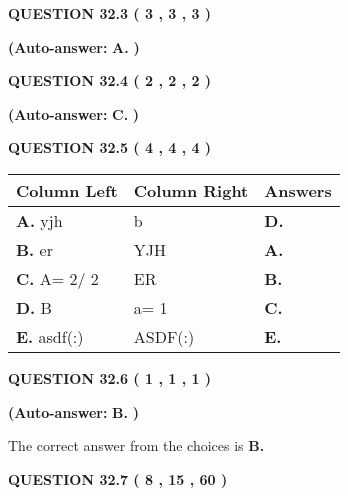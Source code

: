 \documentclass[12pt]{article}
\begin{document}
  
  
{\textbf{\large{QUESTION
32.3 
 (           3 ,           3 ,           3 )
}}}
 
 
{\textbf{(Auto-answer:}}
{\textbf{\large{
A.}}}
{\textbf{)}}
 
 
  
  
{\textbf{\large{QUESTION
32.4 
 (           2 ,           2 ,           2 )
}}}
 
 
{\textbf{(Auto-answer:}}
{\textbf{\large{
C.}}}
{\textbf{)}}
 
 
  
  
{\textbf{\large{QUESTION
32.5 
 (           4 ,           4 ,           4 )
}}}
 
 
\noindent{}
  
  
\begin{tabular}{|l|l|l|}
 \hline
 Column Left & Column Right  & Answers       \\ 
 \hline
{\textbf{\large{
A.}}}
yjh
  & 
b
 & 
{\textbf{\large{
D.}}}
 \\ 
 \hline
{\textbf{\large{
B.}}}
er
  & 
YJH
 & 
{\textbf{\large{
A.}}}
 \\ 
 \hline
{\textbf{\large{
C.}}}
 A= %
2/ %
2

  & 
ER
 & 
{\textbf{\large{
B.}}}
 \\ 
 \hline
{\textbf{\large{
D.}}}
B
  & 
 a= %
1
 & 
{\textbf{\large{
C.}}}
 \\ 
 \hline
{\textbf{\large{
E.}}}
asdf(:)
  & 
ASDF(:)
 & 
{\textbf{\large{
E.}}}
 \\ 
 \hline
 \end{tabular}
  
  
\noindent{}
 
 
  
  
{\textbf{\large{QUESTION
32.6 
 (           1 ,           1 ,           1 )
}}}
 
 
{\textbf{(Auto-answer:}}
{\textbf{\large{
B.}}}
{\textbf{)}}
 
 

The correct answer from the choices is
{\textbf{\large{
B.}}}
 
  
  
{\textbf{\large{QUESTION
32.7 
 (           8 ,          15 ,          60 )
}}}
\end{document}
